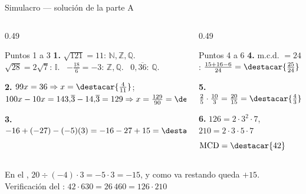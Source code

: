\documentclass[aspectratio=169,10pt]{beamer}
\begin{document}
\begin{frame}{Simulacro — solución de la parte A}
  \scriptsize
  \begin{columns}[T,onlytextwidth]
    \begin{column}{0.49\textwidth}
      \begin{block}{Puntos 1 a 3}
        \tiny
        \textbf{1.} $\sqrt{121}=11$: $\mathbb{N},\mathbb{Z},\mathbb{Q}$. \
        $\sqrt{28}=2\sqrt{7}$: $\mathbb{I}$. \
        $-\tfrac{18}{6}=-3$: $\mathbb{Z},\mathbb{Q}$. \
        $0{,}\overline{36}$: $\mathbb{Q}$.

        \vspace{0.08cm}
        \textbf{2.} $99x=36 \Rightarrow x=\destacar{\tfrac{4}{11}}$; \quad
        $100x-10x = 143{,}\overline{3}-14{,}\overline{3} = 129
        \Rightarrow x=\tfrac{129}{90}=\destacar{\tfrac{43}{30}}$

        \vspace{0.08cm}
        \textbf{3.} $-16 + (-27) - (-5)(3) = -16-27+15
        = \destacar{-28}$
      \end{block}
    \end{column}
    \begin{column}{0.49\textwidth}
      \begin{block}{Puntos 4 a 6}
        \tiny
        \textbf{4.} m.c.d. $=24$:
        $\tfrac{15+16-6}{24} = \destacar{\tfrac{25}{24}}$

        \vspace{0.1cm}
        \textbf{5.} $\tfrac{2}{5}\cdot\tfrac{10}{3}
        = \tfrac{20}{15} = \destacar{\tfrac{4}{3}}$

        \vspace{0.1cm}
        \textbf{6.} $126=2\cdot 3^{2}\cdot 7$, \
        $210 = 2\cdot 3\cdot 5\cdot 7$
        \[ \mathrm{MCD}=\destacar{42} \qquad
           \mathrm{mcm}=\destacar{630} \]
      \end{block}
    \end{column}
  \end{columns}

  \vspace{0.06cm}
  {\tiny\color{uniGris} En el , $20\div(-4)\cdot 3 = -5\cdot 3
  = -15$, y como va restando queda $+15$. Verificación del :
  $42\cdot 630 = 26\,460 = 126\cdot 210$ \checkmark}
\end{frame}
\end{document}
